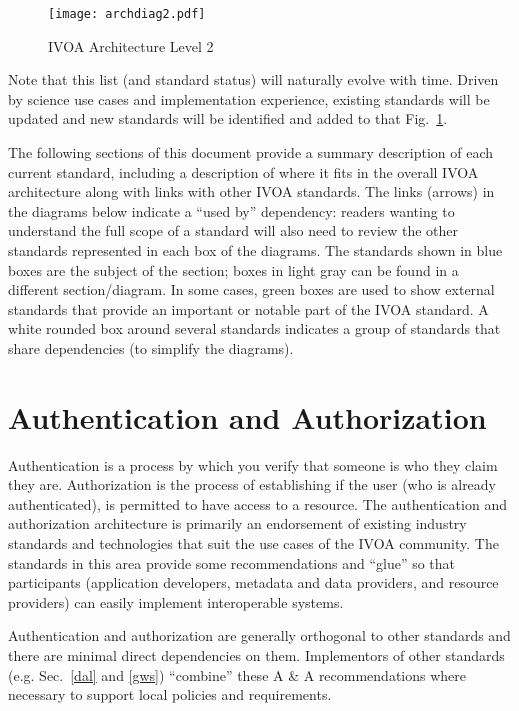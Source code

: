 \documentclass[11pt,letter]{ivoa}
\begin{document}
\begin{figure}[ht]
\centering
\texttt{[image: archdiag2.pdf]}
\caption{IVOA Architecture Level 2}
\label{fig:architecture2}
\end{figure}

Note that this list (and standard status) will naturally evolve with
time. Driven by
science use cases and implementation experience, existing standards will
be updated and
new standards will be identified and added to that
Fig.~\ref{fig:architecture2}.

The following sections of this document provide a summary description of
each current standard,
including a description of where it fits in the overall IVOA
architecture along with links with
other IVOA standards. The links 
(arrows) in the diagrams below indicate a ``used by'' dependency:
readers wanting to
understand the full scope of a standard will also need to review the
other standards
represented in each box of the diagrams. 
The standards shown in blue boxes are the subject of the section; 
boxes in light gray can be found in a different section/diagram. 
In some cases, green boxes are used to show external standards that
provide an
important or notable part of the IVOA standard. 
A white rounded box around several standards indicates a group of
standards that share
dependencies (to simplify the diagrams).

\section{Authentication and Authorization}

Authentication is a process by which you verify that someone is who they
claim they
are. Authorization is the process of establishing if the user (who is
already authenticated),
is permitted to have access to a resource. The authentication and
authorization architecture
is primarily an endorsement of existing
industry standards and technologies that suit the use cases of the IVOA
community. The standards
in this area provide some recommendations and ``glue'' so that
participants (application
developers, metadata and data providers, and resource providers) can
easily implement interoperable
systems.

Authentication and authorization are generally orthogonal to other
standards and there are minimal
direct dependencies on them. Implementors of other standards (e.g.
Sec.~\ref{dal} and \ref{gws})
``combine'' these A \& A recommendations where necessary to support
local policies and requirements.
\end{document}
